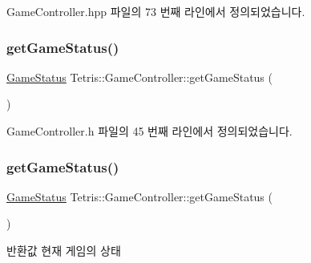 Game\+Controller.\+hpp 파일의 73 번째 라인에서 정의되었습니다.

\mbox{\label{class_tetris_1_1_game_controller_a3b95b1b7a3a18c27402100f70c1ac1ab}} 
\subsubsection{\texorpdfstring{get\+Game\+Status()}{getGameStatus()}\hspace{0.1cm}{\footnotesize\ttfamily [1/2]}}
{\footnotesize\ttfamily \hyperlink{class_tetris_1_1_game_controller_a96a963b56385f3b3a122ff0ca2beb770}{Game\+Status} Tetris\+::\+Game\+Controller\+::get\+Game\+Status (\begin{DoxyParamCaption}{ }\end{DoxyParamCaption})\hspace{0.3cm}{\ttfamily [inline]}}



Game\+Controller.\+h 파일의 45 번째 라인에서 정의되었습니다.

\mbox{\label{class_tetris_1_1_game_controller_a3b95b1b7a3a18c27402100f70c1ac1ab}} 
\subsubsection{\texorpdfstring{get\+Game\+Status()}{getGameStatus()}\hspace{0.1cm}{\footnotesize\ttfamily [2/2]}}
{\footnotesize\ttfamily \hyperlink{class_tetris_1_1_game_controller_a96a963b56385f3b3a122ff0ca2beb770}{Game\+Status} Tetris\+::\+Game\+Controller\+::get\+Game\+Status (\begin{DoxyParamCaption}{ }\end{DoxyParamCaption})\hspace{0.3cm}{\ttfamily [inline]}}

\begin{DoxyReturn}{반환값}
현재 게임의 상태 
\end{DoxyReturn}


